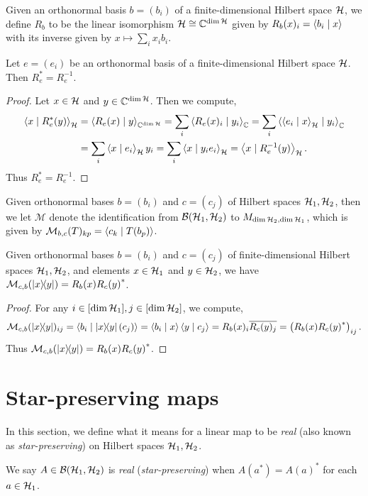  Given an orthonormal basis $b=(b_i)$ of a finite-dimensional Hilbert space $\mathcal{H}$, we define $R_b$ to be the linear isomorphism $\mathcal{H}\cong\mathbb{C}^{\dim\mathcal{H}}$ given by $R_b(x)_i=\left\langle b_i \mid x\right\rangle$ with its inverse given by $x\mapsto\sum_ix_ib_i$.
 \begin{lemma}\label{repr_adjoint}\leanok
  Let $e=(e_i)$ be an orthonormal basis of a finite-dimensional Hilbert space $\mathcal{H}$. Then $R_e^*=R_e^{-1}$.
 \end{lemma}
 \begin{proof}\leanok
  Let $x\in\mathcal{H}$ and $y\in\mathbb{C}^{\dim\mathcal{H}}$. Then we compute,
  \begin{align*}
   \left\langle x \mid R_e^*(y)\right\rangle_{\mathcal{H}} &= \left\langle R_e(x) \mid y\right\rangle_{\mathbb{C}^{\dim\mathcal{H}}} = \sum_i\left\langle R_e(x)_i \mid y_i\right\rangle_{\mathbb{C}} = \sum_i\left\langle\left\langle e_i \mid x\right\rangle_{\mathcal{H}} \mid y_i\right\rangle_{\mathbb{C}}\\
   &= \sum_i\left\langle x \mid e_i\right\rangle_{\mathcal{H}}y_i = \sum_i\left\langle x \mid y_ie_i\right\rangle_{\mathcal{H}}=\left\langle x \mid R_e^{-1}(y)\right\rangle_{\mathcal{H}}.
  \end{align*}
  Thus $R_e^*=R_e^{-1}$.
 \end{proof}
 Given orthonormal bases $b=(b_i)$ and $c=(c_j)$ of Hilbert spaces $\mathcal{H}_1,\mathcal{H}_2$, then we let $\mathcal{M}$ denote the identification from $\mathcal{B}(\mathcal{H}_1,\mathcal{H}_2)$ to $M_{\dim\mathcal{H}_2,\dim\mathcal{H}_1}$, which is given by $\mathcal{M}_{b,c}(T)_{kp}=\left\langle c_k \mid T(b_p)\right\rangle$.
 \begin{lemma}\label{rankOne_toMatrix}\leanok
  Given orthonormal bases $b=(b_i)$ and $c=(c_j)$ of finite-dimensional Hilbert spaces $\mathcal{H}_1,\mathcal{H}_2$, and elements $x\in\mathcal{H}_1$ and $y\in\mathcal{H}_2$, we have $\mathcal{M}_{c,b}(\left\lvert x\right\rangle\!\!\left\langle y\right\rvert)=R_b(x){R_c(y)}^*$.
 \end{lemma}
 \begin{proof}\leanok
  For any $i\in[\dim\mathcal{H}_1],j\in[\dim\mathcal{H}_2]$, we compute,
  \[\mathcal{M}_{c,b}(\left\lvert x\right\rangle\!\!\left\langle y\right\rvert)_{ij}=\left\langle b_i \mid \left\lvert x\right\rangle\!\!\left\langle y\right\rvert(c_j)\right\rangle=\left\langle b_i \mid x\right\rangle\left\langle y \mid c_j\right\rangle=R_b(x)_i\overline{R_c(y)_j}=\left(R_b(x){R_c(y)}^*\right)_{ij}.\]
  Thus $\mathcal{M}_{c,b}(\left\lvert x\right\rangle\!\!\left\langle y\right\rvert)=R_b(x){R_c(y)}^*$.
 \end{proof}

\chapter{Star-preserving maps}
 In this section, we define what it means for a linear map to be \textit{real} (also known as \textit{star-preserving}) on Hilbert spaces $\mathcal{H}_1,\mathcal{H}_2$.
 
 \begin{definition}\label{LinearMap.IsReal}\leanok
  We say $A\in\mathcal{B}(\mathcal{H}_1,\mathcal{H}_2)$ is \textit{real} (\textit{star-preserving}) when $A(a^*)={A(a)}^*$ for each $a\in\mathcal{H}_1$.
 \end{definition}
 
